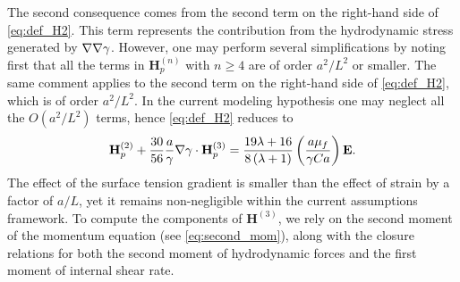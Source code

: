 The second consequence comes from the second term on the right-hand side of \ref{eq:def_H2}. 
This term represents the contribution from the hydrodynamic stress generated by $\mathbf{\nabla}\mathbf{\nabla}\gamma$. 
However, one may perform several simplifications by noting first that all the terms in $\textbf{H}_p^{(n)}$ with $n\geq 4$ are of order $a^2/L^2$ or smaller.
The same comment applies to the second term on the right-hand side of \ref{eq:def_H2}, which is of order $a^2/L^2$.
In the current modeling hypothesis one may neglect all the $O(a^2 / L^2)$  terms, hence \ref{eq:def_H2} reduces to
\begin{align}    
        \textbf{H}_p^{(2)}
        +
        \frac{30}{56}\frac{a}{\gamma}\grad\gamma\cdot \textbf{H}^{(3)}_p
        =
        \frac{19 \lambda + 16}{8 \left(\lambda + 1\right)}
        \left(\frac{a \mu_f}{\gamma Ca}\right)
        \textbf{E}. 
        \label{eq:H2_simplified}
\end{align}
The effect of the surface tension gradient is smaller than the effect of strain by a factor of $a/L$, yet it remains non-negligible within the current assumptions framework.
To compute the components of $\textbf{H}^{(3)}$, we rely on the second moment of the momentum equation (see \ref{eq:second_mom}), along with the closure relations for both the second moment of hydrodynamic forces and the first moment of internal shear rate. 
